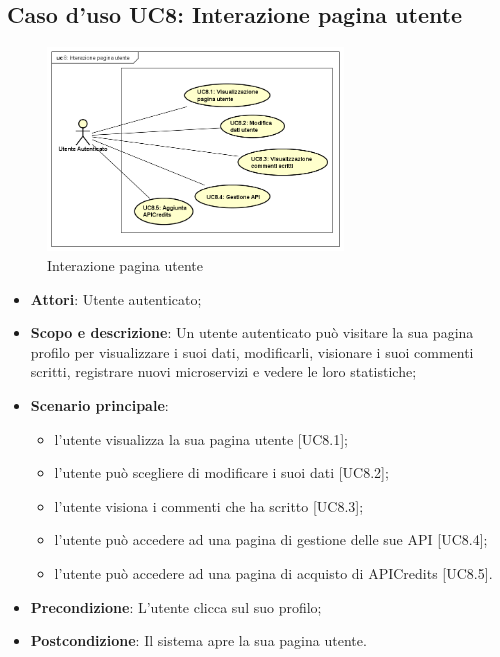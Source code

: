 \documentclass[12pt,a4paper,titlepage]{article}
\begin{document}
	\subsection{Caso d'uso UC8: Interazione pagina utente}
	\label{UC8}
	\begin{figure}[H]
		\centering
		\includegraphics[width=0.7\textwidth]{UseCase/InterazionePaginaUtente}
		\caption{Interazione pagina utente}
	\end{figure}
	\begin{itemize}
		\item \textbf{Attori}: Utente autenticato;
		\item \textbf{Scopo e descrizione}: Un utente autenticato può visitare la sua pagina profilo per visualizzare i suoi dati, modificarli, visionare i suoi commenti scritti, registrare nuovi microservizi e vedere le loro statistiche;
		\item \textbf{Scenario principale}: 
			\begin{itemize}
				\item l'utente visualizza la sua pagina utente [UC8.1];
				\item l'utente può scegliere di modificare i suoi dati [UC8.2];
				\item l'utente visiona i commenti che ha scritto [UC8.3];
				\item l'utente può accedere ad una pagina di gestione delle sue API [UC8.4];
				\item l'utente può accedere ad una pagina di acquisto di APICredits [UC8.5].
			\end{itemize}
		\item \textbf{Precondizione}: L'utente clicca sul suo profilo;
		\item \textbf{Postcondizione}: Il sistema apre la sua pagina utente.
	\end{itemize}
\end{document}

